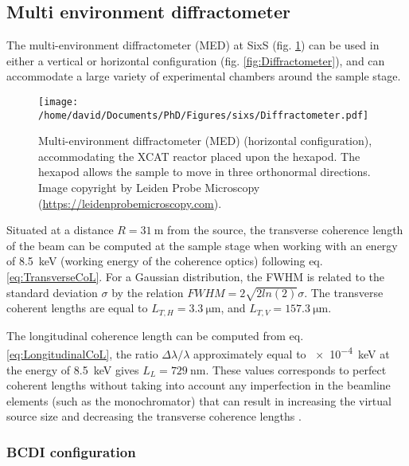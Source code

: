 \subsection{Multi environment diffractometer}\label{sec:MED}

The multi-environment diffractometer (MED) at SixS (fig. \ref{fig:MEDDiffractometer}) can be used in either a vertical or horizontal configuration (fig. \ref{fig:Diffractometer}), and can accommodate a large variety of experimental chambers around the sample stage.

\begin{figure}[!htb]
    \centering
    \texttt{[image: /home/david/Documents/PhD/Figures/sixs/Diffractometer.pdf]}
    \caption{
        Multi-environment diffractometer (MED) (horizontal configuration), accommodating the XCAT reactor \parencite{VanRijn2010} placed upon the hexapod.
        The hexapod allows the sample to move in three orthonormal directions.\\
        Image copyright by Leiden Probe Microscopy (\url{https://leidenprobemicroscopy.com}).
    }
    \label{fig:MEDDiffractometer}
\end{figure}

Situated at a distance $R = \qty{31}{\m}$ from the source, the transverse coherence length of the beam can be computed at the sample stage when working with an energy of \qty{8.5}{\keV} (working energy of the coherence optics) following eq. \ref{eq:TransverseCoL}.
For a Gaussian distribution, the FWHM is related to the standard deviation $\sigma$ by the relation $FWHM = 2\sqrt{2 ln (2) } \sigma$.
The transverse coherent lengths are equal to $L_{T,H} = \qty{3.3}{\um}$, and $L_{T,V} = \qty{157.3}{\um}$.

The longitudinal coherence length can be computed from eq. \ref{eq:LongitudinalCoL}, the ratio $\Delta\lambda/\lambda$ approximately equal to \qty{e-4}{\keV} at the energy of \qty{8.5}{\keV} gives $L_L = \qty{729}{\nm}$.
These values corresponds to perfect coherent lengths without taking into account any imperfection in the beamline elements (such as the monochromator) that can result in increasing the virtual source size and decreasing the transverse coherence lengths \parencite{Jacques2010}.

\subsubsection{BCDI configuration}

